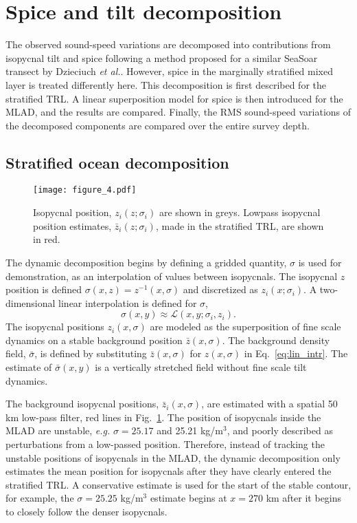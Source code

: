 \documentclass[preprint,NumberedRefs]{JASA}
\begin{document}
\section{\label{sec:decomposition}Spice and tilt decomposition}
The observed sound-speed variations are decomposed into contributions from isopycnal tilt and spice following a method proposed for a similar SeaSoar transect by Dzieciuch \emph{et al.}.\citep{dzieciuch2004} However, spice in the marginally stratified mixed layer is treated differently here. This decomposition is first described for the stratified TRL. A linear superposition model for spice is then introduced for the MLAD, and the results are compared. Finally, the RMS sound-speed variations of the decomposed components are compared over the entire survey depth.

\subsection{Stratified ocean decomposition}
\begin{figure}
\texttt{[image: figure\_4.pdf]}
    \caption{\label{fig:cntrs}{Isopycnal position, $z_i(z; \sigma_i)$ are shown in greys. Lowpass isopycnal position estimates, $\bar{z}_i(z; \sigma_i)$, made in the stratified TRL, are shown in red.}}
\end{figure}

The dynamic decomposition begins by defining a gridded quantity, $\sigma$ is used for demonstration, as an interpolation of values between isopycnals. The isopycnal $z$ position is defined $\sigma(x, z) = z^{-1}(x, \sigma)$ and discretized as $z_i(x; \sigma_i)$. A two-dimensional linear interpolation is defined for $\sigma$,
\begin{equation}
    \sigma(x,y)\approx\mathcal{L}(x, y; \sigma_i, z_i).
    \label{eq:lin_intr}
\end{equation}
The isopycnal positions $z_i(x, \sigma)$ are modeled as the superposition of fine scale dynamics on a stable background position $\bar{z}(x, \sigma)$. The background density field, $\bar{\sigma}$, is defined by substituting $\bar{z}(x, \sigma)$ for $z(x, \sigma)$ in Eq.~\eqref{eq:lin_intr}. The estimate of $\bar{\sigma}(x,y)$ is a vertically stretched field without fine scale tilt dynamics.

The background isopycnal positions, $\bar{z}_i(x, \sigma)$, are estimated with a spatial 50 km low-pass filter, red lines in Fig.~\ref{fig:cntrs}. The position of isopycnals inside the MLAD are unstable, \emph{e.g.} $\sigma=25.17$ and 25.21 kg/m$^3$, and poorly described as perturbations from a low-passed position. Therefore, instead of tracking the unstable positions of isopycnals in the MLAD, the dynamic decomposition only estimates the mean position for isopycnals after they have clearly entered the stratified TRL. A conservative estimate is used for the start of the stable contour, for example, the $\sigma=25.25$ kg/m$^3$ estimate begins at $x=270$ km after it begins to closely follow the denser isopycnals.
\end{document}
